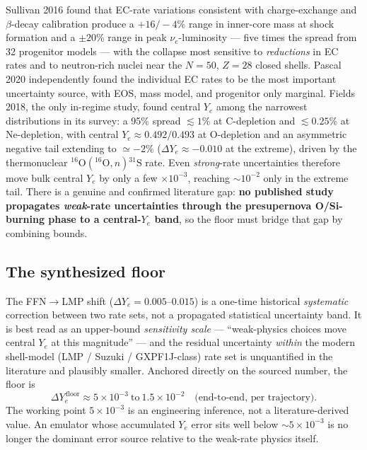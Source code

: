 \documentclass[11pt]{article}
\newcommand{\nuc}[2]{\ensuremath{{}^{#2}\mathrm{#1}}}
\begin{document}
Sullivan 2016 found that EC-rate variations consistent with charge-exchange and $\beta$-decay calibration produce a $+16/-4$\% range in inner-core mass at shock formation and a $\pm20$\% range in peak $\nu_e$-luminosity --- five times the spread from 32 progenitor models --- with the collapse most sensitive to \emph{reductions} in EC rates and to neutron-rich nuclei near the $N = 50$, $Z = 28$ closed shells. Pascal 2020 independently found the individual EC rates to be the most important uncertainty source, with EOS, mass model, and progenitor only marginal. Fields 2018, the only in-regime study, found central $Y_e$ among the narrowest distributions in its survey: a 95\% spread $\lesssim 1$\% at C-depletion and $\lesssim 0.25$\% at Ne-depletion, with central $Y_e \approx 0.492/0.493$ at O-depletion and an asymmetric negative tail extending to $\simeq -2$\% ($\Delta Y_e \approx -0.010$ at the extreme), driven by the thermonuclear $\nuc{O}{16}(\nuc{O}{16},n)\nuc{S}{31}$ rate. Even \emph{strong}-rate uncertainties therefore move bulk central $Y_e$ by only a few $\times 10^{-3}$, reaching $\sim 10^{-2}$ only in the extreme tail. There is a genuine and confirmed literature gap: \textbf{no published study propagates \emph{weak}-rate uncertainties through the presupernova O/Si-burning phase to a central-$Y_e$ band}, so the floor must bridge that gap by combining bounds.

\subsection{The synthesized floor}

The FFN$\to$LMP shift ($\Delta Y_e = 0.005$--$0.015$) is a one-time historical \emph{systematic} correction between two rate sets, not a propagated statistical uncertainty band. It is best read as an upper-bound \emph{sensitivity scale} --- ``weak-physics choices move central $Y_e$ at this magnitude'' --- and the residual uncertainty \emph{within} the modern shell-model (LMP / Suzuki / GXPF1J-class) rate set is unquantified in the literature and plausibly smaller. Anchored directly on the sourced number, the floor is
\begin{equation*}
\boxed{\;\Delta Y_e^{\,\mathrm{floor}} \approx 5\times10^{-3}\ \text{to}\ 1.5\times10^{-2}\quad\text{(end-to-end, per trajectory).}\;}
\end{equation*}
The working point $5\times10^{-3}$ is an engineering inference, not a literature-derived value. An emulator whose accumulated $Y_e$ error sits well below $\sim 5\times10^{-3}$ is no longer the dominant error source relative to the weak-rate physics itself.
\end{document}
